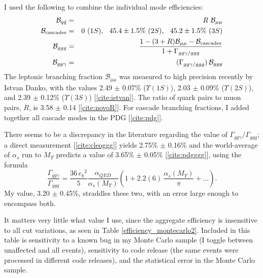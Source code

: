 I used the following to combine the individual mode efficiencies:
\begin{eqnarray}
  \mathcal{B}_{q\bar{q}} &=& R \mbox{ } \mathcal{B}_{\mu\mu} \\
  \mathcal{B}_{\mbox{\scriptsize cascades}} &=& 0 \mbox{ } (1S), \mbox{\hspace{0.25 cm}} 45.4 \pm 1.5\% \mbox{ } (2S), \mbox{\hspace{0.25 cm}} 45.2 \pm 1.5\% \mbox{ } (3S) \\
  \mathcal{B}_{ggg} &=& \frac{1 - (3+R)\mathcal{B}_{\mu\mu} - \mathcal{B}_{\mbox{\scriptsize cascades}}}{1 + \Gamma_{gg\gamma / ggg}} \\
  \mathcal{B}_{gg\gamma} &=& (\Gamma_{gg\gamma/ggg}) \, \mathcal{B}_{ggg}
\end{eqnarray}
The leptonic branching fraction $\mathcal{B}_{\mu\mu}$ was measured to
high precision recently by Istvan Danko, with the values 2.49 $\pm$
0.07\% ($\Upsilon(1S)$), 2.03 $\pm$ 0.09\% ($\Upsilon(2S)$), and 2.39
$\pm$ 0.12\% ($\Upsilon(3S)$) [\ref{cite:istvan}].  The ratio of quark
pairs to muon pairs, $R$, is 3.58 $\pm$ 0.14 [\ref{cite:novoR}].  For
cascade branching fractions, I added together all cascade modes in the
PDG [\ref{cite:pdg}].

There seems to be a discrepancy in the literature regarding the value
of $\Gamma_{gg\gamma}/\Gamma_{ggg}$; a direct measurement
[\ref{cite:cleoggg}] yields 2.75\% $\pm$ 0.16\% and the world-average
of $\alpha_s$ run to $M_\Upsilon$ predicts a value of 3.65\% $\pm$
0.05\% [\ref{cite:pdgggg}], using the formula
\begin{equation}
\frac{\Gamma_{gg\gamma}}{\Gamma_{ggg}} = \frac{36 \, {e_b}^2}{5} \frac{\alpha_{QED}}{\alpha_s(M_\Upsilon)}
\left( 1 + 2.2(6) \, \frac{\alpha_s(M_\Upsilon)}{\pi} + \mbox{\ldots} \right) \mbox{.}
\end{equation}
My value, 3.20 $\pm$ 0.45\%, straddles these two, with an error
large enough to encompass both.

It matters very little what value I use, since the aggregate
efficiency is insensitive to all cut variations, as seen in Table
\ref{efficiency_montecarlo2}.  Included in this table is sensitivity
to a known bug in my Monte Carlo sample (I toggle between unaffected
and all events), sensitivity to code release (the same events were
processed in different code releases), and the statistical error in
the Monte Carlo sample.

